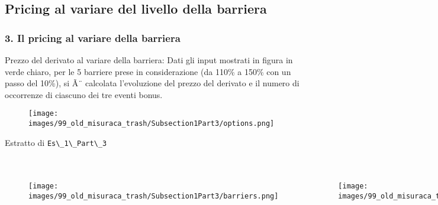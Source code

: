 \subsection[Pricing al variare del livello della barriera]{Pricing al variare del livello della barriera}
\begin{frame}
	\frametitle{3. Il pricing al variare della barriera}

	\begin{block}{Prezzo del derivato al variare della barriera:}
		Dati gli input mostrati in figura in verde chiaro, per le 5 barriere prese in considerazione (da 110\% a 150\% con un passo del 10\%), si Ã¨ calcolata l'evoluzione del prezzo del derivato e il numero di occorrenze di ciascuno dei tre eventi bonus.
	\end{block}

	\begin{figure}[!htbp]
		\centering
		\texttt{[image: images/99\_old\_misuraca\_trash/Subsection1Part3/options.png]}
	\end{figure}

\end{frame}

\begin{frame}{Estratto di \color{black}\Verb+Es\_1\_Part\_3+}
	\inputminted[fontsize=\tiny]{vb.net}{images/99_old_misuraca_trash/assets/part3.txt}
\end{frame} 


\begin{frame}
	\begin{columns}
	
		\begin{figure}[!htbp]
			\centering
			\texttt{[image: images/99\_old\_misuraca\_trash/Subsection1Part3/barriers.png]}
		\end{figure}
		
		\begin{figure}[!htbp]
			\centering
			\texttt{[image: images/99\_old\_misuraca\_trash/Subsection1Part3/prices.png]}
		\end{figure}
	
	\end{columns} 
\end{frame}

